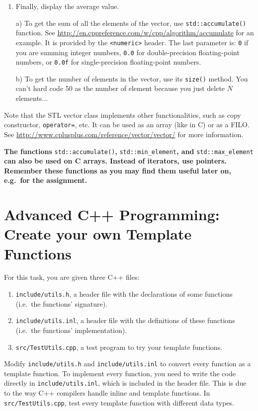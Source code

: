 \begin{enumerate}
\item Finally, display the average value. 

a) To get the sum of all the elements of the vector, use \verb+std::accumulate()+ function. 
See \url{http://en.cppreference.com/w/cpp/algorithm/accumulate} for an example. 
It is provided by the \verb+<numeric>+ header. 
The last parameter is:
\verb+0+ if you are summing integer numbers,
\verb+0.0+ for double-precision floating-point numbers, or 
\verb+0.0f+ for single-precision floating-point numbers.

b) To get the number of elements in the vector, use its \verb+size()+ method. You can't hard code 50 as the number of element because you just delete $N$ elements...
\end{enumerate}

Note that the STL vector class implements other functionalities, such as copy constructor, \verb+operator=+, etc. It can be used as an array (like in C) or as a FILO. See \url{http://www.cplusplus.com/reference/vector/vector/} for more information.

\textbf{The functions} \verb+std::accumulate()+\textbf{,} \verb+std::min_element+\textbf{, and} \verb+std::max_element+ \textbf{can also be used on C arrays. Instead of iterators, use pointers. Remember these functions as you may find them useful later on, e.g.~for the assignment.}

\section{Advanced C++ Programming: Create your own Template Functions}

For this task, you are given three C++ files:
\begin{enumerate}
  \item \verb+include/utils.h+, a header file with the declarations of some functions (i.e.~the functions' signature).
  \item \verb+include/utils.inl+, a header file with the definitions of these functions (i.e.~the functions' implementation).
  \item \verb+src/TestUtils.cpp+, a test program to try your template functions.
\end{enumerate}

Modify \verb+include/utils.h+ and \verb+include/utils.inl+ to convert every function as a template function. 
To implement every function, you need to write the code directly in \verb+include/utils.inl+, which is included in the header file. 
This is due to the way C++ compilers handle inline and template functions. 
In \verb+src/TestUtils.cpp+, test every template function with different data types.


